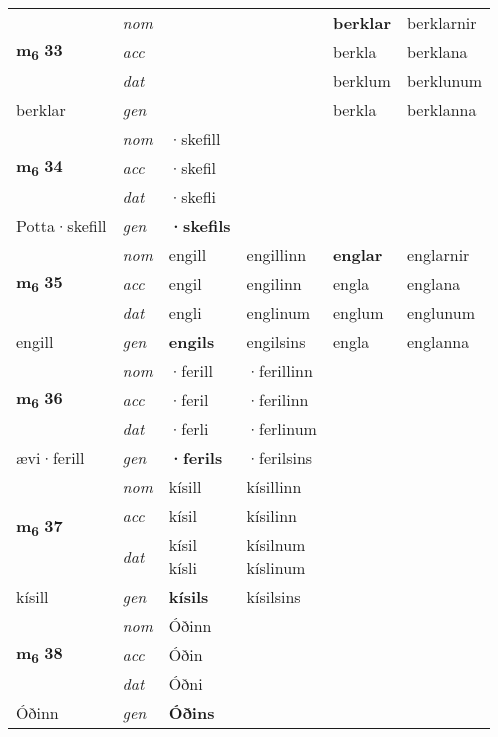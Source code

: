 \begin{longtable}[l]{X>{\footnotesize\itshape}XXXXX}
\multirow{3}{*}{{{\textbf{m{\textsubscript{6}}} \Large{\textbf{33}}}}} & nom &  &  & \textbf{berklar} & berklarnir \\*
 & acc &  &  & berkla & berklana \\*
 & dat &  &  & berklum & berklunum \\*
 {\footnotesize{berklar}} & gen & \textbf{} &  & berkla & berklanna \\
\cmidrule{1-6}

\multirow{3}{*}{{{\textbf{m{\textsubscript{6}}} \Large{\textbf{34}}}}} & nom & ·skefill &  & \textbf{} &  \\*
 & acc & ·skefil &  &  &  \\*
 & dat & ·skefli &  &  &  \\*
 {\footnotesize{Potta\allowbreak ·skefill}} & gen & \textbf{·skefils} &  &  &  \\
\cmidrule{1-6}

\multirow{3}{*}{{{\textbf{m{\textsubscript{6}}} \Large{\textbf{35}}}}} & nom & engill & engillinn & \textbf{englar} & englarnir \\*
 & acc & engil & engilinn & engla & englana \\*
 & dat & engli & englinum & englum & englunum \\*
 {\footnotesize{engill}} & gen & \textbf{engils} & engilsins & engla & englanna \\
\cmidrule{1-6}

\multirow{3}{*}{{{\textbf{m{\textsubscript{6}}} \Large{\textbf{36}}}}} & nom & ·ferill & ·ferillinn & \textbf{} &  \\*
 & acc & ·feril & ·ferilinn &  &  \\*
 & dat & ·ferli & ·ferlinum &  &  \\*
 {\footnotesize{ævi\allowbreak ·ferill}} & gen & \textbf{·ferils} & ·ferilsins &  &  \\


\multirow{3}{*}{{{\textbf{m{\textsubscript{6}}} \Large{\textbf{37}}}}} & nom & kísill & kísillinn & \textbf{} &  \\*
 & acc & kísil & kísilinn &  &  \\*
 & dat & \specialcell{kísil\\ kísli} & \specialcell{kísilnum\\ kíslinum} &  &  \\*
 {\footnotesize{kísill}} & gen & \textbf{kísils} & kísilsins &  &  \\
\cmidrule{1-6}

\multirow{3}{*}{{{\textbf{m{\textsubscript{6}}} \Large{\textbf{38}}}}} & nom & Óðinn &  & \textbf{} &  \\*
 & acc & Óðin &  &  &  \\*
 & dat & Óðni &  &  &  \\*
 {\footnotesize{Óðinn}} & gen & \textbf{Óðins} &  &  &  \\
\cmidrule{1-6}


\end{longtable}
